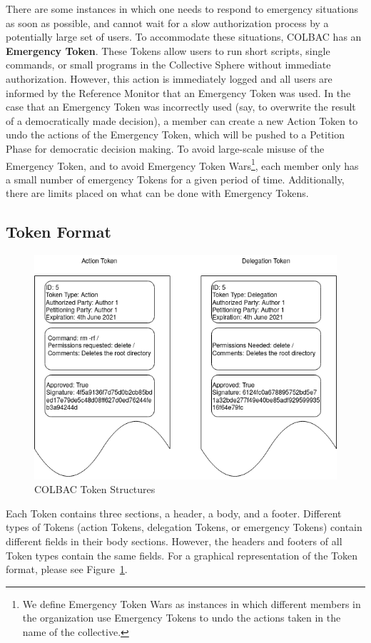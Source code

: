 There are some instances in which one needs to respond to emergency situations
as soon as possible, and cannot wait for a slow authorization process by a
potentially large set of users. To accommodate these situations, COLBAC has an
\textbf{Emergency Token}. These Tokens allow users to run short scripts, single
commands, or small programs in the Collective Sphere without immediate
authorization. However, this action is immediately logged and all users are
informed by the Reference Monitor that an Emergency Token was used. In the case
that an Emergency Token was incorrectly used (say, to overwrite the result of
a democratically made decision), a member can create a new Action Token to
undo the actions of the Emergency Token, which will be pushed to a Petition
Phase for democratic decision making. To avoid large-scale misuse of the
Emergency Token, and to avoid Emergency Token Wars\footnote{We define Emergency
Token Wars as instances in which different members in the organization use
Emergency Tokens to undo the actions taken in the name of the collective.},
each member only has a small number of emergency Tokens for a given period of
time. Additionally, there are limits placed on what can be done with Emergency
Tokens.

\subsection{Token Format}
\label{sec:Tokenformat}
\begin{figure}
\includegraphics[width=\linewidth]{figs/TokenStructures.png}
\caption{COLBAC Token Structures}
\label{fig:Tokenformatfigure}
\end{figure}
Each Token contains three sections, a header, a body, and a footer. Different
types of Tokens (action Tokens, delegation Tokens, or emergency Tokens) contain
different fields in their body sections. However, the headers and footers of all
Token types contain the same fields. For a graphical representation of the Token
format, please see Figure~\ref{fig:Tokenformatfigure}.

